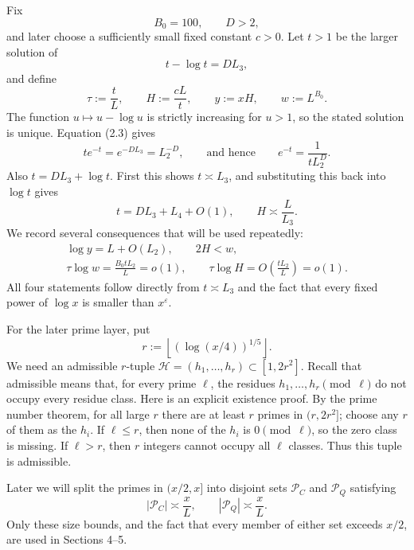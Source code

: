 \documentclass[10pt,letterpaper]{article}
\newcommand{\PC}{\mathcal{P}_C}
\newcommand{\PQ}{\mathcal{P}_Q}
\newcommand{\HH}{\mathcal{H}}
\begin{document}
Fix
\[
B_0=100,\qquad D>2,
\]
and later choose a sufficiently small fixed constant $c>0$. Let $t>1$ be the larger solution of
\begin{equation}
t-\log t=DL_3,
\tag{2.3}
\end{equation}
and define
\begin{equation}
\tau:=\frac{t}{L},\qquad H:=\frac{cL}{t},\qquad y:=xH,\qquad w:=L^{B_0}.
\tag{2.4}
\end{equation}
The function $u\mapsto u-\log u$ is strictly increasing for $u>1$, so the stated solution is unique. Equation (2.3)
gives
\begin{equation}
te^{-t}=e^{-DL_3}=L_2^{-D},\qquad\text{and hence}\qquad e^{-t}=\frac1{tL_2^D}.
\tag{2.5}
\end{equation}
Also $t=DL_3+\log t$. First this shows $t\asymp L_3$, and substituting this back into $\log t$ gives
\begin{equation}
t=DL_3+L_4+O(1),\qquad H\asymp\frac{L}{L_3}.
\tag{2.6}
\end{equation}
We record several consequences that will be used repeatedly:
\begin{equation}
\begin{gathered}
\log y=L+O(L_2),\qquad 2H<w,\\
\tau\log w=\frac{B_0tL_2}{L}=o(1),\qquad
\tau\log H=O\left(\frac{tL_2}{L}\right)=o(1).
\end{gathered}
\tag{2.7}
\end{equation}
All four statements follow directly from $t\asymp L_3$ and the fact that every fixed power of $\log x$ is smaller than $x^\varepsilon$.

For the later prime layer, put
\begin{equation}
r:=\left\lfloor(\log(x/4))^{1/5}\right\rfloor.
\tag{2.8}
\end{equation}
We need an admissible $r$-tuple $\HH=(h_1,\ldots,h_r)\subset[1,2r^2]$. Recall that admissible means that, for every
prime $\ell$, the residues $h_1,\ldots,h_r\pmod\ell$ do not occupy every residue class. Here is an explicit existence proof.
By the prime number theorem, for all large $r$ there are at least $r$ primes in $(r,2r^2]$; choose any $r$ of them as
the $h_i$. If $\ell\le r$, then none of the $h_i$ is $0\pmod\ell$, so the zero class is missing. If $\ell>r$, then $r$ integers cannot
occupy all $\ell$ classes. Thus this tuple is admissible.

Later we will split the primes in $(x/2,x]$ into disjoint sets $\PC$ and $\PQ$ satisfying
\begin{equation}
|\PC|\asymp\frac{x}{L},\qquad |\PQ|\asymp\frac{x}{L}.
\tag{2.9}
\end{equation}
Only these size bounds, and the fact that every member of either set exceeds $x/2$, are used in Sections 4--5.
\end{document}
